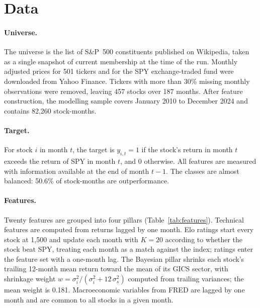 \documentclass[11pt,a4paper]{article}
\begin{document}
\section{Data}

\paragraph{Universe.} The universe is the list of S\&P~500 constituents published on Wikipedia, taken as a single snapshot of current membership at the time of the run. Monthly adjusted prices for 501 tickers and for the SPY exchange-traded fund were downloaded from Yahoo Finance. Tickers with more than 30\% missing monthly observations were removed, leaving 457 stocks over 187 months. After feature construction, the modelling sample covers January 2010 to December 2024 and contains 82{,}260 stock-months.

\paragraph{Target.} For stock $i$ in month $t$, the target is $y_{i,t}=1$ if the stock's return in month $t$ exceeds the return of SPY in month $t$, and 0 otherwise. All features are measured with information available at the end of month $t-1$. The classes are almost balanced: 50.6\% of stock-months are outperformance.

\paragraph{Features.} Twenty features are grouped into four pillars (Table~\ref{tab:features}). Technical features are computed from returns lagged by one month. Elo ratings start every stock at 1{,}500 and update each month with $K=20$ according to whether the stock beat SPY, treating each month as a match against the index; ratings enter the feature set with a one-month lag. The Bayesian pillar shrinks each stock's trailing 12-month mean return toward the mean of its GICS sector, with shrinkage weight $w=\sigma^2_i/(\sigma^2_i+12\,\sigma^2_{s})$ computed from trailing variances; the mean weight is 0.181. Macroeconomic variables from FRED are lagged by one month and are common to all stocks in a given month.
\end{document}
